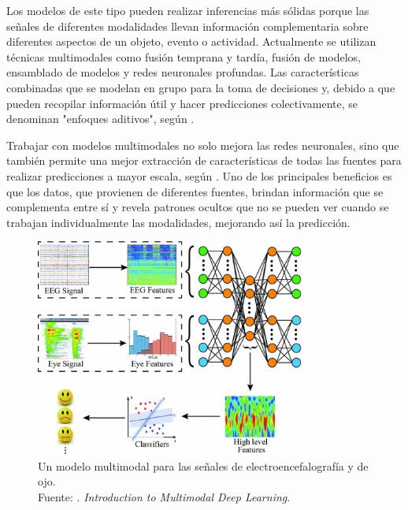 Los modelos de este tipo pueden realizar inferencias más sólidas porque las señales de diferentes modalidades llevan información complementaria sobre diferentes aspectos de un objeto, evento o actividad. Actualmente se utilizan técnicas multimodales como fusión temprana y tardía, fusión de modelos, ensamblado de modelos y redes neuronales profundas. Las características combinadas que se modelan en grupo para la toma de decisiones y, debido a que pueden recopilar información útil y hacer predicciones colectivamente, se denominan "enfoques aditivos", según \parencite{tec_liu2018multideeplearning}.

Trabajar con modelos multimodales no solo mejora las redes neuronales, sino que también permite una mejor extracción de características de todas las fuentes para realizar predicciones a mayor escala, según \cite{tec_baheti2020introduction_mdl}. Uno de los principales beneficios es que los datos, que provienen de diferentes fuentes, brindan información que se complementa entre sí y revela patrones ocultos que no se pueden ver cuando se trabajan individualmente las modalidades, mejorando así la predicción.

\begin{figure}[!ht]
	\begin{center}
		\includegraphics[width=0.79\textwidth]{2/figures/multimodal_deep_learning_example.jpg}
		\caption[Un modelo multimodal para las señales de electroencefalografía y de ojo]{Un modelo multimodal para las señales de electroencefalografía y de ojo.\\
		Fuente: \cite{tec_baheti2020introduction_mdl}. \textit{Introduction to Multimodal Deep Learning}.}
		\label{2:fig7}
	\end{center}
\end{figure}

